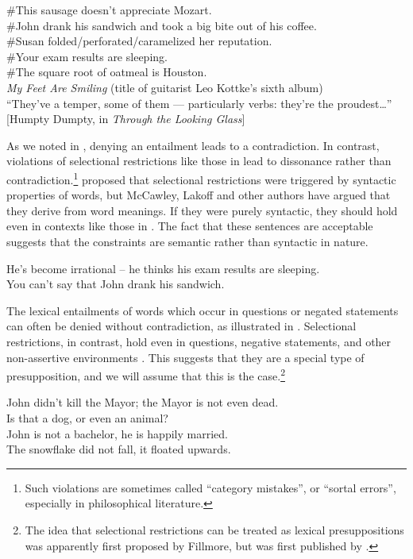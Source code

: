 \ea \label{ex:7.9}
\ea \#This sausage doesn’t appreciate Mozart.\\
\ex \#John drank his sandwich and took a big bite out of his coffee.\\
\ex \#Susan folded/perforated/caramelized her reputation.\\
\ex \#Your exam results are sleeping.\\
\ex \#The square root of oatmeal is Houston.\\
\ex \textit{My Feet Are Smiling} (title of guitarist Leo Kottke’s sixth album)\\
\ex “They’ve a temper, some of them — particularly verbs: they’re the proudest…”\\
  {}[Humpty Dumpty, in \textit{Through the Looking Glass}]
                       \z
\z


As we noted in , denying an entailment leads to a contradiction. In contrast, violations of selectional restrictions like those in  lead to dissonance rather than contradiction.\footnote{Such violations are sometimes called “category mistakes”, or “sortal errors”, especially in philosophical literature.} \citet[95]{Chomsky1965} proposed that selectional restrictions were triggered by syntactic properties of words, but McCawley, Lakoff and other authors have argued that they derive from word meanings. If they were purely syntactic, they should hold even in contexts like those in . The fact that these sentences are acceptable suggests that the constraints are semantic rather than syntactic in nature.

\ea \label{ex:7.10}
\ea He’s become irrational – he thinks his exam results are sleeping.\\
\ex You can’t say that John drank his sandwich.
                       \z
\z

The lexical entailments of words which occur in questions or negated statements can often be denied without contradiction, as illustrated in . Selectional restrictions, in contrast, hold even in questions, negative statements, and other non-assertive environments . This suggests that they are a special type of presupposition, and we will assume that this is the case.\footnote{The idea that selectional restrictions can be treated as lexical presuppositions was apparently first proposed by Fillmore, but was first published by \citet{McCawley1968}.}


\ea \label{ex:7.11}
\ea John didn’t kill the Mayor; the Mayor is not even dead.\\
\ex Is that a dog, or even an animal?\\
\ex John is not a bachelor, he is happily married.\\
\ex The snowflake did not fall, it floated upwards.
                       \z
\z

